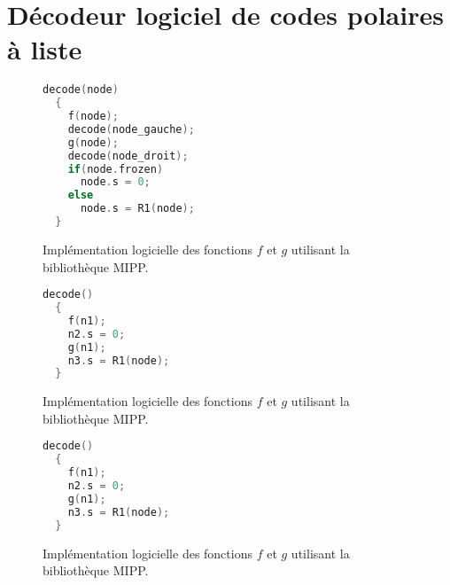 {
\chapter{Décodeur logiciel de codes polaires à liste}
\label{chap:soft_scl}
}
{
\label{chap:soft_scl}
}


\begin{figure}[htp]
\begin{lstlisting}[language=C++, numbers=none, tabsize=2, basicstyle=\footnotesize\ttfamily]
  decode(node)
  {
    f(node);
    decode(node_gauche);
    g(node);
    decode(node_droit);
    if(node.frozen)
      node.s = 0;
    else
      node.s = R1(node);
  }
  \end{lstlisting}
  \caption{Implémentation logicielle des fonctions $f$ et $g$ utilisant la bibliothèque MIPP.}
  \label{fig:mipp}
\end{figure}
\begin{figure}[htp]
\begin{lstlisting}[language=C++, numbers=none, tabsize=2, basicstyle=\footnotesize\ttfamily]
  decode()
  {
    f(n1);
    n2.s = 0;
    g(n1);
    n3.s = R1(node);
  }
  \end{lstlisting}
  \caption{Implémentation logicielle des fonctions $f$ et $g$ utilisant la bibliothèque MIPP.}
  \label{fig:mipp}
\end{figure}

\begin{figure}[htp]
\begin{lstlisting}[language=C++, numbers=none, tabsize=2, basicstyle=\footnotesize\ttfamily]
  decode()
  {
    f(n1);
    n2.s = 0;
    g(n1);
    n3.s = R1(node);
  }
  \end{lstlisting}
  \caption{Implémentation logicielle des fonctions $f$ et $g$ utilisant la bibliothèque MIPP.}
  \label{fig:mipp}
\end{figure}
